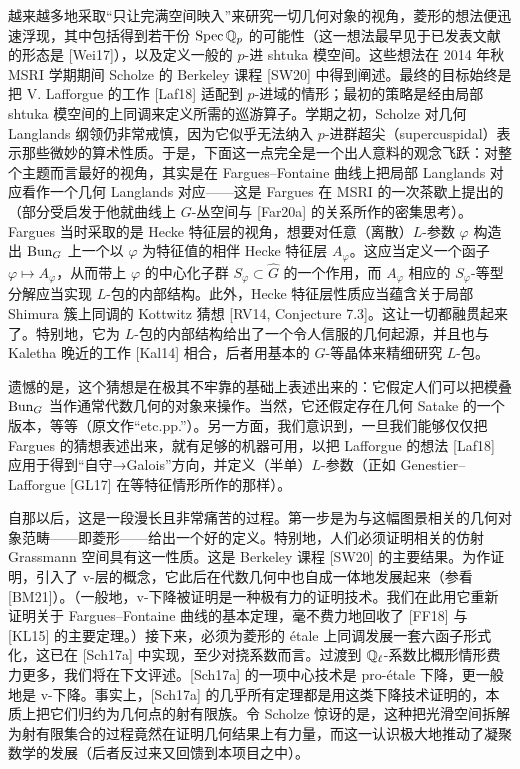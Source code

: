 越来越多地采取“只让完满空间映入”来研究一切几何对象的视角，菱形的想法便迅速浮现，其中包括得到若干份 $\operatorname{Spec}\mathbb{Q}_p$ 的可能性（这一想法最早见于已发表文献的形态是 [Wei17]），以及定义一般的 $p$-进 shtuka 模空间。这些想法在 2014 年秋 MSRI 学期期间 Scholze 的 Berkeley 课程 [SW20] 中得到阐述。最终的目标始终是把 V. Lafforgue 的工作 [Laf18] 适配到 $p$-进域的情形；最初的策略是经由局部 shtuka 模空间的上同调来定义所需的巡游算子。学期之初，Scholze 对几何 Langlands 纲领仍非常戒慎，因为它似乎无法纳入 $p$-进群超尖（supercuspidal）表示那些微妙的算术性质。于是，下面这一点完全是一个出人意料的观念飞跃：对整个主题而言最好的视角，其实是在 Fargues--Fontaine 曲线上把局部 Langlands 对应看作一个几何 Langlands 对应——这是 Fargues 在 MSRI 的一次茶歇上提出的（部分受启发于他就曲线上 $G$-丛空间与 [Far20a] 的关系所作的密集思考）。Fargues 当时采取的是 Hecke 特征层的视角，想要对任意（离散）$L$-参数 $\varphi$ 构造出 $\mathrm{Bun}_G$ 上一个以 $\varphi$ 为特征值的相伴 Hecke 特征层 $A_\varphi$。这应当定义一个函子 $\varphi\mapsto A_\varphi$，从而带上 $\varphi$ 的中心化子群 $S_\varphi\subset\hat G$ 的一个作用，而 $A_\varphi$ 相应的 $S_\varphi$-等型分解应当实现 $L$-包的内部结构。此外，Hecke 特征层性质应当蕴含关于局部 Shimura 簇上同调的 Kottwitz 猜想 [RV14, Conjecture 7.3]。这让一切都融贯起来了。特别地，它为 $L$-包的内部结构给出了一个令人信服的几何起源，并且也与 Kaletha 晚近的工作 [Kal14] 相合，后者用基本的 $G$-等晶体来精细研究 $L$-包。

遗憾的是，这个猜想是在极其不牢靠的基础上表述出来的：它假定人们可以把模叠 $\mathrm{Bun}_G$ 当作通常代数几何的对象来操作。当然，它还假定存在几何 Satake 的一个版本，等等（原文作“etc.pp.”）。另一方面，我们意识到，一旦我们能够仅仅把 Fargues 的猜想表述出来，就有足够的机器可用，以把 Lafforgue 的想法 [Laf18] 应用于得到“自守→Galois”方向，并定义（半单）$L$-参数（正如 Genestier--Lafforgue [GL17] 在等特征情形所作的那样）。

自那以后，这是一段漫长且非常痛苦的过程。第一步是为与这幅图景相关的几何对象范畴——即菱形——给出一个好的定义。特别地，人们必须证明相关的仿射 Grassmann 空间具有这一性质。这是 Berkeley 课程 [SW20] 的主要结果。为作证明，引入了 v-层的概念，它此后在代数几何中也自成一体地发展起来（参看 [BM21]）。（一般地，v-下降被证明是一种极有力的证明技术。我们在此用它重新证明关于 Fargues--Fontaine 曲线的基本定理，毫不费力地回收了 [FF18] 与 [KL15] 的主要定理。）接下来，必须为菱形的 \'etale 上同调发展一套六函子形式化，这已在 [Sch17a] 中实现，至少对挠系数而言。过渡到 $\mathbb{Q}_\ell$-系数比概形情形费力更多，我们将在下文评述。[Sch17a] 的一项中心技术是 pro-\'etale 下降，更一般地是 v-下降。事实上，[Sch17a] 的几乎所有定理都是用这类下降技术证明的，本质上把它们归约为几何点的射有限族。令 Scholze 惊讶的是，这种把光滑空间拆解为射有限集合的过程竟然在证明几何结果上有力量，而这一认识极大地推动了凝聚数学的发展（后者反过来又回馈到本项目之中）。

